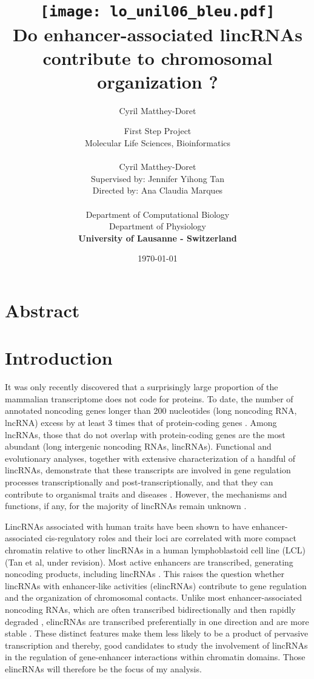 \documentclass[11pt,a4paper]{report}
\author{Cyril Matthey-Doret}
\title{
\texttt{[image: lo\_unil06\_bleu.pdf]} \\
\vspace*{1in}
\textbf{Do enhancer-associated lincRNAs contribute to chromosomal organization ?}}
\author{\Large{First Step Project}\\
		Molecular Life Sciences, Bioinformatics\\
				\vspace*{0.5in} \\
		Cyril Matthey-Doret\\
        Supervised by: Jennifer Yihong Tan\\
        Directed by: Ana Claudia Marques\\
		\vspace*{0.5in} \\
		Department of Computational Biology\\
		Department of Physiology\\
        \textbf{University of Lausanne - Switzerland}\\
       } \date{\today}
\begin{document}
\renewcommand{\headrulewidth}{1pt}
\maketitle

\section*{Abstract}
\section*{Introduction}
It was only recently discovered that a surprisingly large proportion of the mammalian transcriptome does not code for proteins. To date, the number of annotated noncoding genes longer than 200 nucleotides (long noncoding RNA, lncRNA) excess by at least 3 times that of protein-coding genes \cite{Iyer2015}⁠. Among lncRNAs, those that do not overlap with protein-coding genes are the most abundant (long intergenic noncoding RNAs, lincRNAs). Functional and evolutionary analyses, together with extensive characterization of a handful of lincRNAs, demonstrate that these transcripts are involved in gene regulation processes transcriptionally and post-transcriptionally, and that they can contribute to organismal traits and diseases \cite{Kornienko2013}⁠. However, the mechanisms and functions, if any, for the majority of lincRNAs remain unknown \cite{Rinn2012}⁠.

LincRNAs associated with human traits have been shown to have enhancer-associated cis-regulatory roles and their loci are correlated with more compact chromatin relative to other lincRNAs in a human lymphoblastoid cell line (LCL) (Tan et al, under revision). Most active enhancers are transcribed, generating noncoding products, including lincRNAs \cite{Guil2012}⁠. This raises the question whether lincRNAs with enhancer-like activities (elincRNAs) contribute to gene regulation and the organization of  chromosomal contacts. Unlike most enhancer-associated noncoding RNAs, which are often transcribed bidirectionally and then rapidly degraded \cite{Darrow2013}⁠, elincRNAs are transcribed preferentially in one direction and are more stable \cite{Marques2013}⁠. These distinct features make them less likely to be a product of pervasive transcription and thereby, good candidates to study the involvement of lincRNAs in the regulation of gene-enhancer interactions within chromatin domains. Those elincRNAs will therefore be the focus of my analysis.
\end{document}
